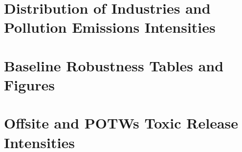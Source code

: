 \documentclass{C:/Users/david/OneDrive/Documents/ULMS/PhD/Thesis/chapter3/src/climate_change/latex/Economic_Journal/OUP-EJ}
\begin{document}
    \section{Distribution of Industries and Pollution Emissions Intensities}\label{sec:appendix-distribution-of-industries-and-pollution-emissions-intensities}
    
    
    
    
    
    
    
    
    
    
    
    
    


    \section{Baseline Robustness Tables and Figures}\label{sec:appendix-baseline-robustness-tables-and-figures}
    
    
    
    
    
    
    
    


    \section{Offsite and POTWs Toxic Release Intensities}\label{sec:offsite-and-potws-toxic-release-intensities}
    
    
    
    
    
    
    
\end{document}
